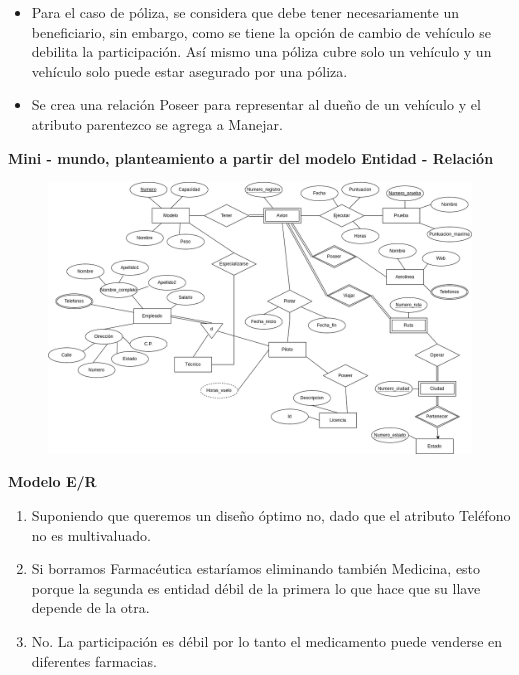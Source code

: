 \documentclass{exam}
\begin{document}
\begin{questions}
\begin{enumerate}[label=\roman*]
\begin{itemize}
\begin{itemize}
	            \item Para el caso de póliza, se considera que debe tener necesariamente un beneficiario, sin embargo, como se tiene la opción de cambio de vehículo se debilita la participación. Así mismo una póliza cubre solo un vehículo y un vehículo solo puede estar asegurado por una póliza.
	            
	            \item Se crea una relación Poseer para representar al dueño de un vehículo y el atributo parentezco se agrega a Manejar.
	        \end{itemize}
	    \end{itemize}
	\end{enumerate}
	
	
	\question \textbf{Mini - mundo, planteamiento a partir del modelo Entidad - Relación}
		\begin{figure}[h!]
	        \centering
	        \includegraphics[width=18cm]{imgNolasco/6.png}
	    \end{figure}
	
	\question \textbf{Modelo E/R}
	
	\begin{enumerate}[label=\alph*]
	    \item Suponiendo que queremos un diseño óptimo no, dado que el atributo Teléfono no es multivaluado.
	    
	    \item Si borramos Farmacéutica estaríamos eliminando también Medicina, esto porque la segunda es entidad débil de la primera lo que hace que su llave depende de la otra.
	    
	    \item No. La participación es débil por lo tanto el medicamento puede venderse en diferentes farmacias.
	    

\end{enumerate}
\end{questions}
\end{document}
